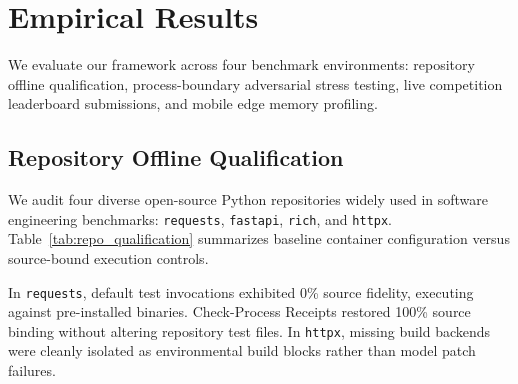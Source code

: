 \documentclass[10pt,twocolumn]{article}
\begin{document}
\section{Empirical Results}

We evaluate our framework across four benchmark environments: repository offline qualification, process-boundary adversarial stress testing, live competition leaderboard submissions, and mobile edge memory profiling.

\subsection{Repository Offline Qualification}
We audit four diverse open-source Python repositories widely used in software engineering benchmarks: \texttt{requests}, \texttt{fastapi}, \texttt{rich}, and \texttt{httpx}. Table~\ref{tab:repo_qualification} summarizes baseline container configuration versus source-bound execution controls.

\begin{table}[t]
\centering
\small
\caption{Repository Offline Qualification and Verification Control Outcomes.}
\label{tab:repo_qualification}
\end{table}

In \texttt{requests}, default test invocations exhibited 0\% source fidelity, executing against pre-installed binaries. Check-Process Receipts restored 100\% source binding without altering repository test files. In \texttt{httpx}, missing build backends were cleanly isolated as environmental build blocks rather than model patch failures.
\end{document}

